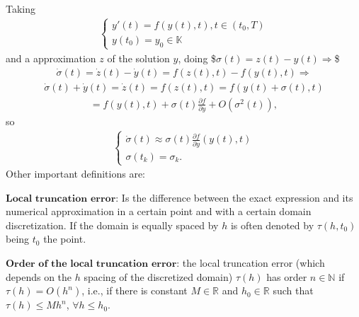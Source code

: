 \documentclass[letterpaper,10pt,english]{jupyterBook}
\begin{document}
\sphinxAtStartPar
Taking
\begin{equation*}
\begin{split}
\begin{cases}
    y'(t) = f(y(t), t), t \in (t_0, T) \\
    y(t_0) = y_0 \in \mathbb{K}
\end{cases}
\end{split}
\end{equation*}
\sphinxAtStartPar
and a approximation \(z\) of the solution \(y\), doing
\$\(
\sigma(t) = z(t) - y(t) \Rightarrow
\)\$
\begin{equation*}
\begin{split}
\dot{\sigma}(t) = \dot{z}(t) - \dot{y}(t) = f(z(t), t) - f(y(t), t) \Rightarrow
\end{split}
\end{equation*}\begin{equation*}
\begin{split}
\dot{\sigma}(t) + \dot{y}(t) = \dot{z}(t) = f(z(t), t) = f(y(t)+\sigma(t), t)
\end{split}
\end{equation*}\begin{equation*}
\begin{split}
 = f(y(t), t) + \sigma(t)\frac{\partial f}{\partial y} + O(\sigma^2(t)),
\end{split}
\end{equation*}
\sphinxAtStartPar
so
\begin{equation*}
\begin{split}
\begin{cases}
    \dot{\sigma}(t) \approx \sigma(t) \frac{\partial f}{\partial y} (y(t), t) \\
    \sigma(t_k) = \sigma_k.
\end{cases}
\end{split}
\end{equation*}
\sphinxAtStartPar
Other important definitions are:

\sphinxAtStartPar
\(\textbf{Local truncation error:}\) Is the difference between the exact expression and its numerical approximation in a certain point and with a certain domain discretization. If the domain is equally spaced by \(h\) is often denoted by \(\tau(h,t_0)\) being \(t_0\) the point.

\sphinxAtStartPar
\(\textbf{Order of the local truncation error:}\) the local truncation error (which depends on the \(h\) spacing of the discretized domain) \(\tau(h)\) has order \(n \in \mathbb{N}\) if \(\tau(h) = O(h^n) \), i.e., if there is constant \(M \in \mathbb{R}\) and \(h_0 \in \mathbb{R}\) such that \(\tau(h) \leq M h^n\), \(\forall h \leq h_0\).
\end{document}
